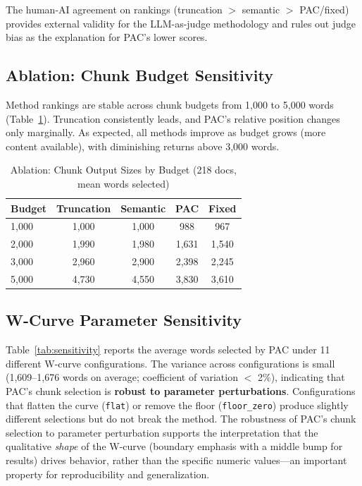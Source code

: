 \documentclass[journal]{IEEEtran}
\begin{document}
The human-AI agreement on rankings (truncation $>$ semantic $>$ PAC/fixed) provides external validity for the LLM-as-judge methodology and rules out judge bias as the explanation for PAC's lower scores.

\subsection{Ablation: Chunk Budget Sensitivity}

Method rankings are stable across chunk budgets from 1{,}000 to 5{,}000 words (Table~\ref{tab:ablation}). Truncation consistently leads, and PAC's relative position changes only marginally. As expected, all methods improve as budget grows (more content available), with diminishing returns above 3{,}000 words.

\begin{table}[h]
\centering
\caption{Ablation: Chunk Output Sizes by Budget (218 docs, mean words selected)}
\label{tab:ablation}
\footnotesize
\begin{tabular}{lcccc}
\toprule
\textbf{Budget} & \textbf{Truncation} & \textbf{Semantic} & \textbf{PAC} & \textbf{Fixed} \\
\midrule
1{,}000 & 1{,}000 & 1{,}000 & 988 & 967 \\
2{,}000 & 1{,}990 & 1{,}980 & 1{,}631 & 1{,}540 \\
3{,}000 & 2{,}960 & 2{,}900 & 2{,}398 & 2{,}245 \\
5{,}000 & 4{,}730 & 4{,}550 & 3{,}830 & 3{,}610 \\
\bottomrule
\end{tabular}
\end{table}

\subsection{W-Curve Parameter Sensitivity}

Table~\ref{tab:sensitivity} reports the average words selected by PAC under 11 different W-curve configurations. The variance across configurations is small (1{,}609--1{,}676 words on average; coefficient of variation $<$ 2\%), indicating that PAC's chunk selection is \textbf{robust to parameter perturbations}. Configurations that flatten the curve (\texttt{flat}) or remove the floor (\texttt{floor\_zero}) produce slightly different selections but do not break the method. The robustness of PAC's chunk selection to parameter perturbation supports the interpretation that the qualitative \textit{shape} of the W-curve (boundary emphasis with a middle bump for results) drives behavior, rather than the specific numeric values---an important property for reproducibility and generalization.
\end{document}
